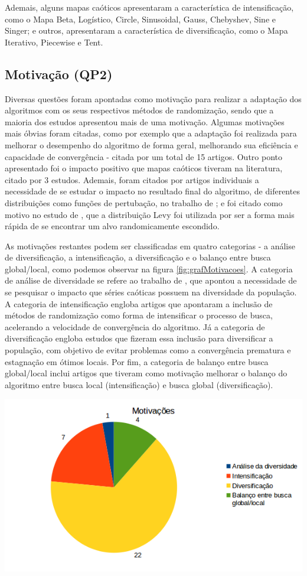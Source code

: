 Ademais, alguns mapas caóticos apresentaram a característica de intensificação, como o Mapa Beta, Logístico, Circle, Sinusoidal, Gauss, Chebyshev, Sine e Singer; e outros, apresentaram a característica de diversificação, como o Mapa Iterativo, Piecewise e Tent. 

\subsection{Motivação (QP2)}

Diversas questões foram apontadas como motivação para realizar a adaptação dos algoritmos com os seus respectivos métodos de randomização, sendo que a maioria dos estudos apresentou mais de uma motivação. Algumas motivações mais óbvias foram citadas, como por exemplo que a adaptação foi realizada para melhorar o desempenho do algoritmo de forma geral, melhorando sua eficiência e capacidade de convergência - citada por um total de 15 artigos. Outro ponto apresentado foi o impacto positivo que mapas caóticos tiveram na literatura, citado por 3 estudos. Ademais, foram citados por artigos individuais a necessidade de se estudar o impacto no resultado final do algoritmo, de diferentes distribuições como funções de pertubação, no trabalho de \cite{yu}; e foi citado como motivo no estudo de \cite{ismail}, que a distribuição Levy foi utilizada por ser a forma mais rápida de se encontrar um alvo randomicamente escondido.

As motivações restantes podem ser classificadas em quatro categorias - a análise de diversificação, a intensificação, a diversificação e o balanço entre busca global/local, como podemos observar na figura \ref{fig:grafMotivacoes}. A categoria de análise de diversidade se refere ao trabalho de \cite{senserik2}, que apontou a necessidade de se pesquisar o impacto que séries caóticas possuem na diversidade da população. A categoria de intensificação engloba artigos que apontaram a inclusão de métodos de randomização como forma de intensificar o processo de busca, acelerando a velocidade de convergência do algoritmo. Já a categoria de diversificação engloba estudos que fizeram essa inclusão para diversificar a população, com objetivo de evitar problemas como a convergência prematura e estagnação em ótimos locais. Por fim, a categoria de balanço entre busca global/local inclui artigos que tiveram como motivação melhorar o balanço do algoritmo entre busca local (intensificação) e busca global (diversificação).

{
    \centering
    \includegraphics[width=0.7\linewidth]{figuras/graficoMotivacoes.png}
    \label{fig:grafMotivacoes}
}

